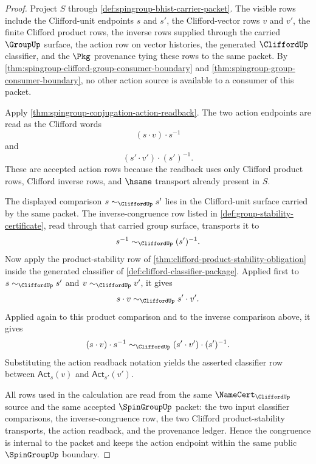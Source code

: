 \begin{proof}
Project $S$ through \autoref{def:spingroup-bhist-carrier-packet}. The visible
rows include the Clifford-unit endpoints $s$ and $s'$, the Clifford-vector
rows $v$ and $v'$, the finite Clifford product rows, the inverse rows supplied
through the carried $\GroupUp$ surface, the action row on vector histories,
the generated $\CliffordUp$ classifier, and the $\Pkg$ provenance tying these
rows to the same packet. By
\autoref{thm:spingroup-clifford-group-consumer-boundary} and
\autoref{thm:spingroup-group-consumer-boundary}, no other action source is
available to a consumer of this packet.

Apply \autoref{thm:spingroup-conjugation-action-readback}. The two action
endpoints are read as the Clifford words
$$
(s\cdot v)\cdot s^{-1}
$$
and
$$
(s'\cdot v')\cdot (s')^{-1}.
$$
These are accepted action rows because the readback uses only Clifford product
rows, Clifford inverse rows, and $\hsame$ transport already present in $S$.

The displayed comparison $s\sim_{\CliffordUp}s'$ lies in the Clifford-unit
surface carried by the same packet. The inverse-congruence row listed in
\autoref{def:group-stability-certificate}, read through that carried group
surface, transports it to
$$
s^{-1}\sim_{\CliffordUp}(s')^{-1}.
$$
Now apply the product-stability row of
\autoref{thm:clifford-product-stability-obligation} inside the generated
classifier of \autoref{def:clifford-classifier-package}. Applied first to
$s\sim_{\CliffordUp}s'$ and $v\sim_{\CliffordUp}v'$, it gives
$$
s\cdot v\sim_{\CliffordUp}s'\cdot v'.
$$
Applied again to this product comparison and to the inverse comparison above,
it gives
$$
(s\cdot v)\cdot s^{-1}
\sim_{\CliffordUp}
(s'\cdot v')\cdot (s')^{-1}.
$$
Substituting the action readback notation yields the asserted classifier row
between $\mathsf{Act}_{s}(v)$ and $\mathsf{Act}_{s'}(v')$.

All rows used in the calculation are read from the same $\NameCert_{\CliffordUp}$
source and the same accepted $\SpinGroupUp$ packet: the two input classifier
comparisons, the inverse-congruence row, the two Clifford product-stability
transports, the action readback, and the provenance ledger. Hence the
congruence is internal to the packet and keeps the action endpoint within the
same public $\SpinGroupUp$ boundary.
\end{proof}
